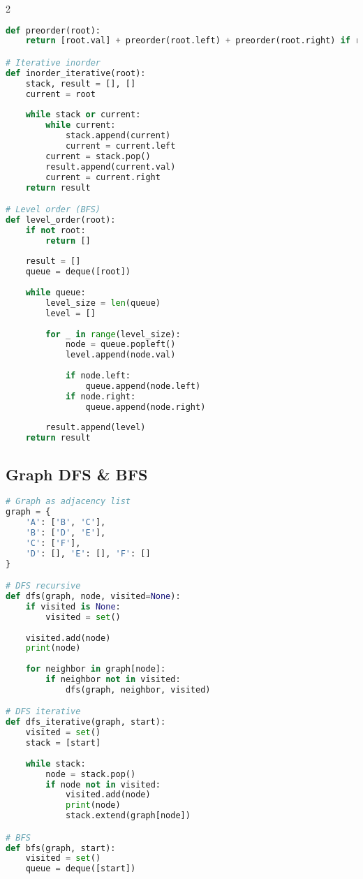 \documentclass[9pt,a4paper]{article}
\begin{document}
\begin{multicols}{2}
\begin{lstlisting}[language=Python]
def preorder(root):
    return [root.val] + preorder(root.left) + preorder(root.right) if root else []

# Iterative inorder
def inorder_iterative(root):
    stack, result = [], []
    current = root
    
    while stack or current:
        while current:
            stack.append(current)
            current = current.left
        current = stack.pop()
        result.append(current.val)
        current = current.right
    return result

# Level order (BFS)
def level_order(root):
    if not root:
        return []
    
    result = []
    queue = deque([root])
    
    while queue:
        level_size = len(queue)
        level = []
        
        for _ in range(level_size):
            node = queue.popleft()
            level.append(node.val)
            
            if node.left:
                queue.append(node.left)
            if node.right:
                queue.append(node.right)
        
        result.append(level)
    return result
\end{lstlisting}

\subsection*{Graph DFS \& BFS}
\begin{lstlisting}[language=Python]
# Graph as adjacency list
graph = {
    'A': ['B', 'C'],
    'B': ['D', 'E'],
    'C': ['F'],
    'D': [], 'E': [], 'F': []
}

# DFS recursive
def dfs(graph, node, visited=None):
    if visited is None:
        visited = set()
    
    visited.add(node)
    print(node)
    
    for neighbor in graph[node]:
        if neighbor not in visited:
            dfs(graph, neighbor, visited)

# DFS iterative
def dfs_iterative(graph, start):
    visited = set()
    stack = [start]
    
    while stack:
        node = stack.pop()
        if node not in visited:
            visited.add(node)
            print(node)
            stack.extend(graph[node])

# BFS
def bfs(graph, start):
    visited = set()
    queue = deque([start])
    

\end{lstlisting}
\end{multicols}
\end{document}
